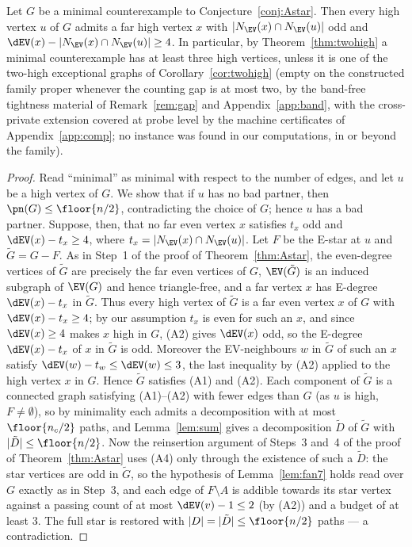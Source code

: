 \begin{proposition}\label{prop:residue}
Let $G$ be a minimal counterexample to Conjecture~\ref{conj:Astar}. Then every
high vertex $u$ of $G$ admits a far high vertex $x$ with
$|N_{\EV}(x)\cap N_{\EV}(u)|$ odd and $\dEV(x)-|N_{\EV}(x)\cap N_{\EV}(u)|\ge4$.
In particular, by Theorem~\ref{thm:twohigh} a minimal counterexample has at least three high
vertices, unless it is one of the two-high exceptional graphs of Corollary~\ref{cor:twohigh}
(empty on the constructed family proper whenever the counting gap is at most two, by the
band-free tightness material of Remark~\ref{rem:gap} and Appendix~\ref{app:band}, with the
cross-private extension covered at probe level by the machine certificates of
Appendix~\ref{app:comp}; no instance was found in our computations, in or beyond the family).
\end{proposition}
\begin{proof}
Read ``minimal'' as minimal with respect to the number of edges, and let $u$
be a high vertex of $G$. We show that if $u$ has no bad partner, then
$\pn(G)\le\floor{n/2}$, contradicting the choice of $G$; hence $u$ has a bad
partner. Suppose, then, that no far even vertex $x$ satisfies
$t_x$ odd and $\dEV(x)-t_x\ge4$, where $t_x=|N_{\EV}(x)\cap N_{\EV}(u)|$.
Let $F$ be the E-star at $u$ and $\tilde G=G-F$. As in Step~1 of the proof of
Theorem~\ref{thm:Astar}, the even-degree vertices of $\tilde G$ are precisely
the far even vertices of $G$, $\EV(\tilde G)$ is an induced subgraph of
$\EV(G)$ and hence triangle-free, and a far vertex $x$ has E-degree
$\dEV(x)-t_x$ in $\tilde G$. Thus every high vertex of $\tilde G$ is a far
even vertex $x$ of $G$ with $\dEV(x)-t_x\ge4$; by our assumption $t_x$ is
even for such an $x$, and since $\dEV(x)\ge4$ makes $x$ high in $G$, (A2)
gives $\dEV(x)$ odd, so the E-degree $\dEV(x)-t_x$ of $x$ in $\tilde G$ is
odd. Moreover the EV-neighbours $w$ in $\tilde G$ of such an $x$ satisfy
$\dEV(w)-t_w\le\dEV(w)\le3$, the last inequality by (A2) applied to the high
vertex $x$ in $G$. Hence $\tilde G$ satisfies {\rm(A1)} and {\rm(A2)}. Each
component of $\tilde G$ is a connected graph satisfying {\rm(A1)}--{\rm(A2)}
with fewer edges than $G$ (as $u$ is high, $F\neq\emptyset$), so by minimality
each admits a decomposition with at most $\floor{n_c/2}$ paths, and
Lemma~\ref{lem:sum} gives a decomposition $\tilde D$ of $\tilde G$ with
$|\tilde D|\le\floor{n/2}$. Now the reinsertion argument of Steps~3 and~4 of
the proof of Theorem~\ref{thm:Astar} uses (A4) only through the existence of
such a $\tilde D$: the star vertices are odd in $\tilde G$, so the hypothesis
of Lemma~\ref{lem:fan7} holds read over $G$ exactly as in Step~3, and each
edge of $F\setminus A$ is addible towards its star vertex against a passing
count of at most $\dEV(v)-1\le2$ (by (A2)) and a budget of at least $3$. The
full star is restored with $|D|=|\tilde D|\le\floor{n/2}$ paths --- a
contradiction.
\end{proof}

